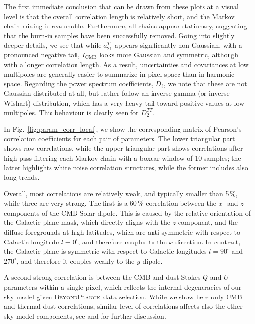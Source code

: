 \documentclass[twocolumn]{aa}
\newcommand{\BP}{\textsc{BeyondPlanck}}
\begin{document}
The first immediate conclusion that can be drawn from these plots at a
visual level is that the overall correlation length is relatively
short, and the Markov chain mixing is reasonable. Furthermore, all
chains appear stationary, suggesting that the burn-in samples have
been successfully removed. Going into slightly deeper details, we see
that while $a_{21}^{T}$ appears significantly non-Gaussian, with a
pronounced negative tail, $I_{\mathrm{CMB}}$ looks more Gaussian and
symmetric, although with a longer correlation length. As a result,
uncertainties and covariances at low multipoles are generally easier
to summarize in pixel space than in harmonic space. Regarding the
power spectrum coefficients, $D_{\ell}$, we note that these are not
Gaussian distributed at all, but rather follow an inverse gamma (or
inverse Wishart) distribution, which has a very heavy tail toward
positive values at low multipoles. This behaviour is clearly seen for
$D_{2}^{TT}$. 

In Fig.~\ref{fig:param_corr_local}, we show the corresponding matrix of
Pearson's correlation coefficients for each pair of parameters. The
lower triangular part shows raw correlations, while the upper triangular part shows correlations after high-pass filtering each Markov chain with a boxcar
window of 10 samples; the latter highlights white noise correlation
structures, while the former includes also long trends.

Overall, most correlations are relatively weak, and typically smaller
than 5\,\%, while three are very strong. The first is a 60\,\%
correlation between the $x$- and $z$-components of the CMB Solar
dipole. This is caused by the relative orientation of the Galactic
plane mask, which directly aligns with the $z$-component, and the
diffuse foregrounds at high latitudes, which are anti-symmetric with
respect to Galactic longitude $l=0^{\circ}$, and therefore couples to
the $x$-direction. In contrast, the Galactic plane is symmetric with
respect to Galactic longitudes $l=90^{\circ}$ and $270^{\circ}$, and
therefore it couples weakly to the $y$-dipole.

A second strong correlation is between the CMB and dust Stokes $Q$ and $U$ parameters within a single pixel, which reflects the internal degeneracies of our sky model given \BP\ data selection. While we show here only CMB and thermal dust correlations, similar level of correlations affects also the other sky model components, see \cite{bp10} and \cite{bp13} for further discussion. 
  
\end{document}

